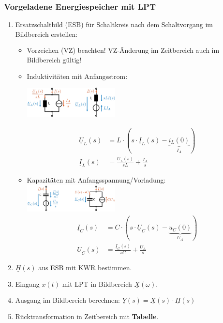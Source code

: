 \subsubsection{Vorgeladene Energiespeicher mit LPT}
\begin{enumerate}
    \item Ersatzschaltbild (ESB) für Schaltkreis nach dem
        Schaltvorgang im Bildbereich erstellen:
        \begin{itemize}
        	\item Vorzeichen (VZ) beachten! VZ-Änderung im Zeitbereich auch im Bildbereich gültig!
            \item Induktivitäten mit Anfangsstrom:
            
                \includegraphics[width=0.4\textwidth]{Bilder/ESB_Fuer_stromfuehrende_Induktivitaet}
                
                \begin{align*}
                    \underline{U}_L(s) &= L\cdot(s\cdot\underline{I}_L(s)-\underbrace{i_L(0)}_{I_A})\\
                    \underline{I}_L(s) &= \frac{\underline{U}_L(s)}{sL}+\frac{I_A}{s}
                \end{align*}
            \item Kapazitäten mit Anfangsspannung/Vorladung:
                \includegraphics[width=0.4\textwidth]{Bilder/ESB_Fuer_geladene_Kapazitaet}
                \begin{align*}
                    \underline{I}_C(s) &= C\cdot(s\cdot\underline{U}_C(s)-\underbrace{u_C(0)}_{U_A})\\
                    \underline{U}_C(s) &= \frac{\underline{I}_C(s)}{sC}+\frac{U_A}{s}
                \end{align*}
        \end{itemize}
    \item $\underline{H}(s)$ aus ESB mit KWR bestimmen.
    \item Eingang $x(t)$ mit LPT in Bildbereich $\underline{X}(\omega)$.
    \item Ausgang im Bildbereich berechnen: $\underline{Y}(s) =
        \underline{X}(s)\cdot \underline{H}(s)$
    \item Rücktransformation in Zeitbereich mit \textbf{Tabelle}.
\end{enumerate}
